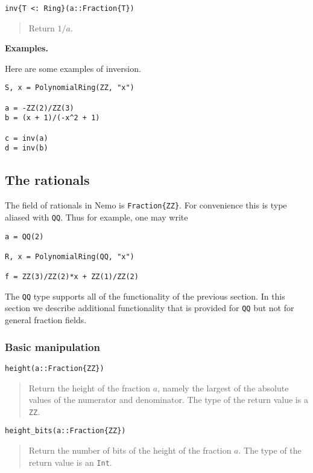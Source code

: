 \documentclass[a4paper,10pt]{article}
\newcommand{\code}{\lstinline}
\newcommand{\desc}[1]{\vspace{-3mm}\begin{quote}#1\end{quote}}
\begin{document}
{{\begin{lstlisting}
inv{T <: Ring}(a::Fraction{T})
\end{lstlisting}

\desc{Return $1/a$.}

\textbf{Examples.}

Here are some examples of inversion.

\begin{lstlisting}
S, x = PolynomialRing(ZZ, "x")

a = -ZZ(2)/ZZ(3)
b = (x + 1)/(-x^2 + 1)

c = inv(a)
d = inv(b)
\end{lstlisting}

\subsection{The rationals}

The field of rationals in Nemo is \code|Fraction{ZZ}|. For convenience this is
type aliased with \code{QQ}. Thus for example, one may write

\begin{lstlisting}
a = QQ(2)

R, x = PolynomialRing(QQ, "x")

f = ZZ(3)/ZZ(2)*x + ZZ(1)/ZZ(2)
\end{lstlisting}

The \code{QQ} type supports all of the functionality of the previous section. In
this section we describe additional functionality that is provided for \code{QQ}
but not for general fraction fields.

\subsubsection{Basic manipulation}

\begin{lstlisting}
height(a::Fraction{ZZ})
\end{lstlisting}

\desc{Return the height of the fraction $a$, namely the largest of the absolute
values of the numerator and denominator. The type of the return value is a 
\code{ZZ}.}

\begin{lstlisting}
height_bits(a::Fraction{ZZ})
\end{lstlisting}

\desc{Return the number of bits of the height of the fraction $a$. The type of
the return value is an \code{Int}.}

}}
\end{document}
